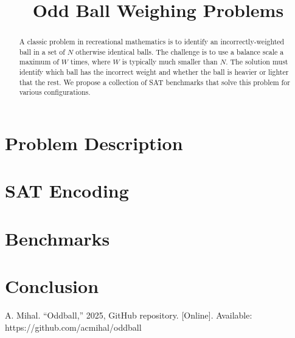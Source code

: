 \documentclass[conference]{IEEEtran}
\begin{document}
\title{Odd Ball Weighing Problems}

\author{
}

\maketitle

\begin{abstract}
A classic problem in recreational mathematics is to identify an incorrectly-weighted ball in a set of $N$ otherwise identical balls.
The challenge is to use a balance scale a maximum of $W$ times, where $W$ is typically much smaller than $N$.
The solution must identify which ball has the incorrect weight and whether the ball is heavier or lighter that the rest.
We propose a collection of SAT benchmarks that solve this problem for various configurations.
\end{abstract}

\section{Problem Description}

\section{SAT Encoding}

\section{Benchmarks}

\section{Conclusion}

\begin{thebibliography}{0}
 A. Mihal. ``Oddball,'' 2025, GitHub repository. [Online]. Available: https://github.com/acmihal/oddball
\end{thebibliography}
\end{document}
